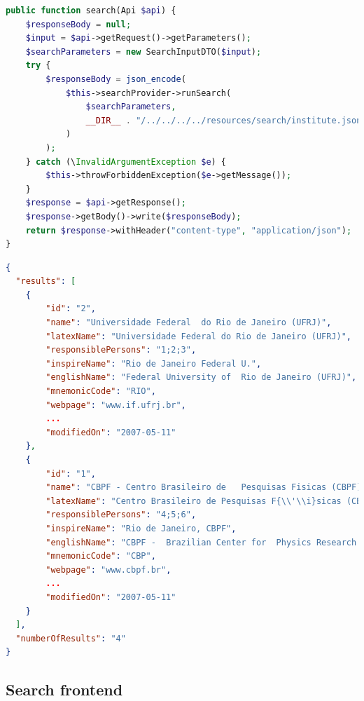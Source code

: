 \begin{lstlisting}[language=php, caption={InstituteController's search method.}, basicstyle=\tiny, label=lst:search_controller]
public function search(Api $api) {
    $responseBody = null;
    $input = $api->getRequest()->getParameters();
    $searchParameters = new SearchInputDTO($input);
    try {
        $responseBody = json_encode(
            $this->searchProvider->runSearch(
                $searchParameters,
                __DIR__ . "/../../../../resources/search/institute.json"
            )
        );
    } catch (\InvalidArgumentException $e) {
        $this->throwForbiddenException($e->getMessage());
    }
    $response = $api->getResponse();
    $response->getBody()->write($responseBody);
    return $response->withHeader("content-type", "application/json");
}
\end{lstlisting}

\begin{lstlisting}[language=json, caption={Search output example.}, basicstyle=\tiny, label=lst:search_results]
{
  "results": [
    {
        "id": "2",
        "name": "Universidade Federal  do Rio de Janeiro (UFRJ)",
        "latexName": "Universidade Federal do Rio de Janeiro (UFRJ)",
        "responsiblePersons": "1;2;3",
        "inspireName": "Rio de Janeiro Federal U.",
        "englishName": "Federal University of  Rio de Janeiro (UFRJ)",
        "mnemonicCode": "RIO",
        "webpage": "www.if.ufrj.br",
        ...
        "modifiedOn": "2007-05-11"
    },
    {
        "id": "1",
        "name": "CBPF - Centro Brasileiro de   Pesquisas Fisicas (CBPF)",
        "latexName": "Centro Brasileiro de Pesquisas F{\\'\\i}sicas (CBPF)",
        "responsiblePersons": "4;5;6",
        "inspireName": "Rio de Janeiro, CBPF",
        "englishName": "CBPF -  Brazilian Center for  Physics Research (CBPF)",
        "mnemonicCode": "CBP",
        "webpage": "www.cbpf.br",
        ...
        "modifiedOn": "2007-05-11"
    }
  ],
  "numberOfResults": "4"
}
\end{lstlisting}

\subsection{Search frontend}

